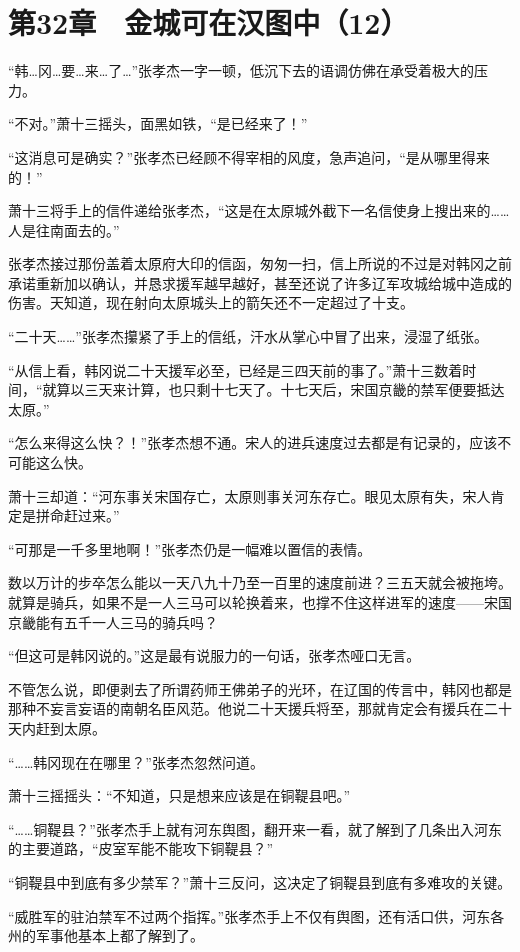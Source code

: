 \section{第32章　金城可在汉图中（12）}

“韩…冈…要…来…了…”张孝杰一字一顿，低沉下去的语调仿佛在承受着极大的压力。

“不对。”萧十三摇头，面黑如铁，“是已经来了！”

“这消息可是确实？”张孝杰已经顾不得宰相的风度，急声追问，“是从哪里得来的！”

萧十三将手上的信件递给张孝杰，“这是在太原城外截下一名信使身上搜出来的……人是往南面去的。”

张孝杰接过那份盖着太原府大印的信函，匆匆一扫，信上所说的不过是对韩冈之前承诺重新加以确认，并恳求援军越早越好，甚至还说了许多辽军攻城给城中造成的伤害。天知道，现在射向太原城头上的箭矢还不一定超过了十支。

“二十天……”张孝杰攥紧了手上的信纸，汗水从掌心中冒了出来，浸湿了纸张。

“从信上看，韩冈说二十天援军必至，已经是三四天前的事了。”萧十三数着时间，“就算以三天来计算，也只剩十七天了。十七天后，宋国京畿的禁军便要抵达太原。”

“怎么来得这么快？！”张孝杰想不通。宋人的进兵速度过去都是有记录的，应该不可能这么快。

萧十三却道：“河东事关宋国存亡，太原则事关河东存亡。眼见太原有失，宋人肯定是拼命赶过来。”

“可那是一千多里地啊！”张孝杰仍是一幅难以置信的表情。

数以万计的步卒怎么能以一天八九十乃至一百里的速度前进？三五天就会被拖垮。就算是骑兵，如果不是一人三马可以轮换着来，也撑不住这样进军的速度——宋国京畿能有五千一人三马的骑兵吗？

“但这可是韩冈说的。”这是最有说服力的一句话，张孝杰哑口无言。

不管怎么说，即便剥去了所谓药师王佛弟子的光环，在辽国的传言中，韩冈也都是那种不妄言妄语的南朝名臣风范。他说二十天援兵将至，那就肯定会有援兵在二十天内赶到太原。

“……韩冈现在在哪里？”张孝杰忽然问道。

萧十三摇摇头：“不知道，只是想来应该是在铜鞮县吧。”

“……铜鞮县？”张孝杰手上就有河东舆图，翻开来一看，就了解到了几条出入河东的主要道路，“皮室军能不能攻下铜鞮县？”

“铜鞮县中到底有多少禁军？”萧十三反问，这决定了铜鞮县到底有多难攻的关键。

“威胜军的驻泊禁军不过两个指挥。”张孝杰手上不仅有舆图，还有活口供，河东各州的军事他基本上都了解到了。


